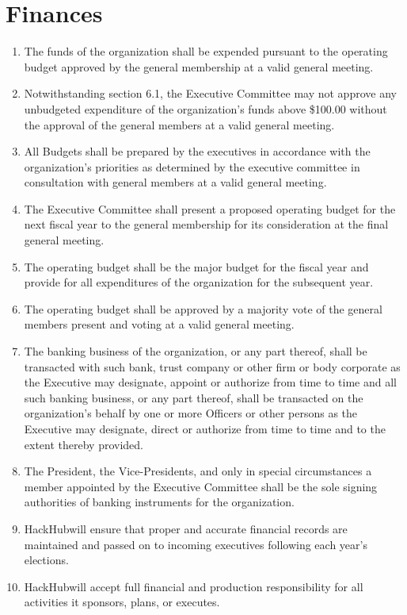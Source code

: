 \documentclass[12pt]{article}
\newcommand{\orgname}{HackHub\space}
\begin{document}
\section{Finances}
\begin{enumerate}[{6}.1]
    \item The funds of the organization shall be expended pursuant to the operating budget approved by the general membership at a valid general meeting. 
    \item Notwithstanding section 6.1, the Executive Committee may not approve any unbudgeted expenditure of the organization’s funds above \$100.00 without the approval of the general members at a valid general meeting. 
    \item All Budgets shall be prepared by the executives in accordance with the organization’s priorities as determined by the executive committee in consultation with general members at a valid general meeting. 
    \item The Executive Committee shall present a proposed operating budget for the next fiscal year to the general membership for its consideration at the final general meeting. 
    \item The operating budget shall be the major budget for the fiscal year and provide for all expenditures of the organization for the subsequent year.
    \item The operating budget shall be approved by a majority vote of the general members present and voting at a valid general meeting. 
    \item The banking business of the organization, or any part thereof, shall be transacted with such bank, trust company or other firm or body corporate as the Executive may designate, appoint or authorize from time to time and all such banking business, or any part thereof, shall be transacted on the organization's behalf by one or more Officers or other persons as the Executive may designate, direct or authorize from time to time and to the extent thereby provided.
    \item The President, the Vice-Presidents, and only in special circumstances a member appointed by the Executive Committee shall be the sole signing authorities of banking instruments for the organization.  
    \item \orgname will ensure that proper and accurate financial records are maintained and passed on to incoming executives following each year’s elections.
    \item	\orgname will accept full financial and production responsibility for all activities it sponsors, plans, or executes.
\end{enumerate}
\end{document}
